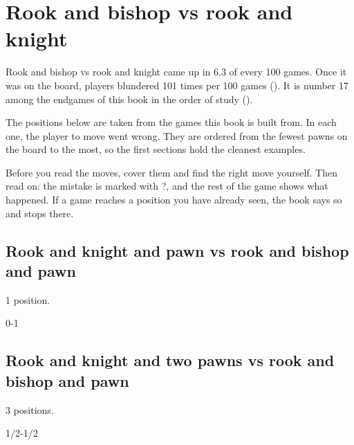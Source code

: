 \chapter{Rook and bishop vs rook and knight}\label{ch:rook-and-bishop-vs-rook-and-knight}
Rook and bishop vs rook and knight came up in 6.3 of every 100 games. Once it was on the board, players blundered 101 times per 100 games (). It is number 17 among the endgames of this book in the order of study ().

The positions below are taken from the games this book is built from. In each one, the player to move went wrong. They are ordered from the fewest pawns on the board to the most, so the first sections hold the cleanest examples.

Before you read the moves, cover them and find the right move yourself. Then read on: the mistake is marked with ?, and the rest of the game shows what happened. If a game reaches a position you have already seen, the book says so and stops there.


\section{Rook and knight and pawn vs rook and bishop and pawn}
1 position.


0-1\par
\section{Rook and knight and two pawns vs rook and bishop and pawn}
3 positions.


1/2-1/2\par
{}

